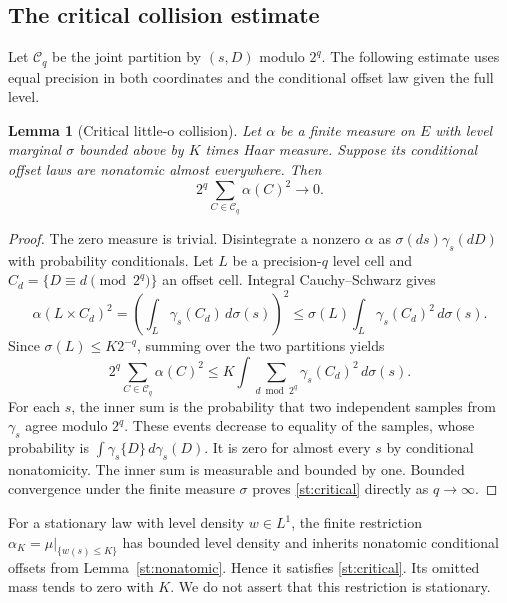 \documentclass[11pt]{amsart}
\newtheorem{lemma}[theorem]{Lemma}
\theoremstyle{definition}
\theoremstyle{remark}
\begin{document}
\subsection{The critical collision estimate}
\label{st:collision-subsection}

Let $\mathcal C_q$ be the joint partition by $(s,D)$ modulo $2^q$.
The following estimate uses equal precision in both coordinates and
the conditional offset law given the full level.

\begin{lemma}[Critical little-o collision]\label{st:collision}
Let $\alpha$ be a finite measure on $E$ with level marginal $\sigma$
bounded above by $K$ times Haar measure.  Suppose its conditional offset
laws are nonatomic almost everywhere.  Then
\begin{equation}
 2^q\sum_{C\in\mathcal C_q}\alpha(C)^2\longrightarrow0.
 \label{st:critical}
\end{equation}
\end{lemma}
\begin{proof}
The zero measure is trivial.  Disintegrate a nonzero $\alpha$ as
$\sigma(ds)\gamma_s(dD)$ with probability conditionals.  Let $L$ be a
precision-$q$ level cell and $C_d=\{D\equiv d\pmod{2^q}\}$ an offset
cell.  Integral Cauchy--Schwarz gives
\[
 \alpha(L\times C_d)^2
 =\left(\int_L\gamma_s(C_d)\,d\sigma(s)\right)^2
 \le \sigma(L)\int_L\gamma_s(C_d)^2\,d\sigma(s).
\]
Since $\sigma(L)\le K2^{-q}$, summing over the two partitions yields
\begin{equation}
 2^q\sum_{C\in\mathcal C_q}\alpha(C)^2
 \le K\int\sum_{d\bmod2^q}\gamma_s(C_d)^2\,d\sigma(s).
 \label{st:collision-bound}
\end{equation}
For each $s$, the inner sum is the probability that two independent
samples from $\gamma_s$ agree modulo $2^q$.  These events decrease to
equality of the samples, whose probability is
$\int\gamma_s\{D\}\,d\gamma_s(D)$.  It is zero for almost every $s$
by conditional nonatomicity.  The inner sum is measurable and bounded
by one.  Bounded convergence under the finite measure $\sigma$ proves
\eqref{st:critical} directly as $q\to\infty$.
\end{proof}

For a stationary law with level density $w\in L^1$, the finite restriction
$\alpha_K=\mu|_{\{w(s)\le K\}}$ has bounded level density and inherits
nonatomic conditional offsets from Lemma~\ref{st:nonatomic}.  Hence it
satisfies \eqref{st:critical}.  Its omitted mass tends to zero with $K$.
We do not assert that this restriction is stationary.
\end{document}
